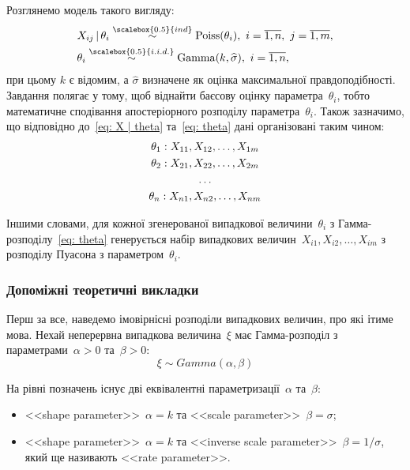 \documentclass{mathreport}
\begin{document}
Розглянемо модель такого вигляду:
\begin{align}
    & X_{ij} \,|\, \theta_i \overset{\scalebox{0.5}{ind}}{\sim} \mathrm{Poiss}(\theta_i),\ i=\overline{1,n},\ j=\overline{1,m}, \label{eq: X | theta} \\
    & \theta_i \overset{\scalebox{0.5}{i.i.d.}}{\sim} \mathrm{Gamma}(k,\widehat{\sigma}),\ i=\overline{1,n},  \label{eq: theta}
\end{align}
при цьому $k$ є відомим, а $\widehat{\sigma}$ визначене як оцінка максимальної правдоподібності. Завдання полягає у тому, щоб віднайти баєсову оцінку параметра~$\theta_i$, тобто математичне сподівання апостеріорного розподілу параметра~$\theta_i$. Також зазначимо, що відповідно до~\eqref{eq: X | theta} та~\eqref{eq: theta} дані організовані таким чином:
\begin{equation}
    \begin{gathered}
        \theta_1 : X_{11},X_{12},\ldots,X_{1m} \\
        \theta_2 : X_{21},X_{22},\ldots,X_{2m} \\
        \hfill \ldots \hfill  \\
        \theta_n : X_{n1},X_{n2},\ldots,X_{nm}
    \end{gathered} 
\end{equation}

Іншими словами, для кожної згенерованої випадкової величини~$\theta_i$ з Гамма-розподілу~\eqref{eq: theta} генерується набір випадкових величин~$X_{i1},X_{i2},\ldots,X_{im}$ з розподілу Пуасона з параметром~$\theta_i$.

\subsubsection*{Допоміжні теоретичні викладки}

Перш за все, наведемо імовірнісні розподіли випадкових величин, про які ітиме мова. Нехай неперервна  випадкова величина~$\xi$ має Гамма-розподіл з параметрами~$\alpha>0$ та~$\beta>0:$
\begin{equation}
    \xi \sim Gamma(\alpha,\beta)
\end{equation}

На рівні позначень існує дві еквівалентні параметризації~$\alpha$ та~$\beta:$
\begin{itemize}
    \item <<shape parameter>>~$\alpha=k$ та <<scale parameter>>~$\beta=\sigma$;
    \item <<shape parameter>>~$\alpha=k$ та <<inverse scale parameter>>~$\beta=1/\sigma$, який ще називають <<rate parameter>>.
\end{itemize}
\end{document}

